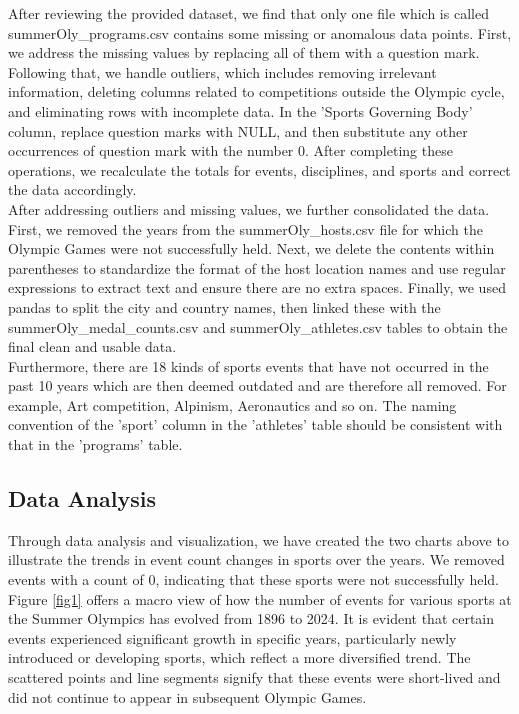 \documentclass[12pt]{article}
\begin{document}
\quad \quad After reviewing the provided dataset, we find that only one file which is called summerOly\_programs.csv contains some missing or anomalous data points. First, we address the missing values by replacing all of them with a question mark. Following that, we handle outliers, which includes removing irrelevant information, deleting columns related to competitions outside the Olympic cycle, and eliminating rows with incomplete data. In the 'Sports Governing Body' column, replace question marks with NULL, and then substitute any other occurrences of question mark with the number 0. After completing these operations, we recalculate the totals for events, disciplines, and sports and correct the data accordingly.\\

After addressing outliers and missing values, we further consolidated the data. First, we removed the years from the summerOly\_hosts.csv file for which the Olympic Games were not successfully held. Next, we delete the contents within parentheses to standardize the format of the host location names and use regular expressions to extract text and ensure there are no extra spaces. Finally, we used pandas to split the city and country names, then linked these with the summerOly\_medal\_counts.csv and summerOly\_athletes.csv tables to obtain the final clean and usable data.\\

Furthermore, there are 18 kinds of sports events that have not occurred in the past 10 years which are then deemed outdated and are therefore all removed. For example, Art competition, Alpinism, Aeronautics and so on. The naming convention of the 'sport' column in the 'athletes' table should be consistent with that in the 'programs' table.

\subsection{Data Analysis}

\quad \quad Through data analysis and visualization, we have created the two charts above to illustrate the trends in event count changes in sports over the years. We removed events with a count of 0, indicating that these sports were not successfully held. \\

Figure \ref{fig1} offers a macro view of how the number of events for various sports at the Summer Olympics has evolved from 1896 to 2024. It is evident that certain events experienced significant growth in specific years, particularly newly introduced or developing sports, which reflect a more diversified trend. The scattered points and line segments signify that these events were short-lived and did not continue to appear in subsequent Olympic Games. \\
\end{document}
